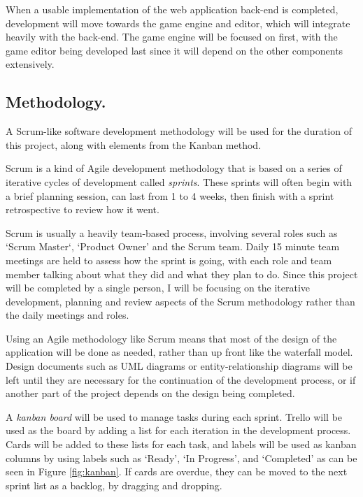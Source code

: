 \documentclass[a4paper, 12pt]{article}
\begin{document}
When a usable implementation of the web application back-end is completed, development will move towards the game engine and editor, which will integrate heavily with the back-end. The game engine will be focused on first, with the game editor being developed last since it will depend on the other components extensively.

\subsection{Methodology.}
A Scrum-like software development methodology will be used for the duration of this project, along with elements from the Kanban method.

Scrum is a kind of Agile development methodology that is based on a series of iterative cycles of development called \emph{sprints}. These sprints will often begin with a brief planning session, can last from 1 to 4 weeks, then finish with a sprint retrospective to review how it went.

Scrum is usually a heavily team-based process, involving several roles such as `Scrum Master`, `Product Owner' and the Scrum team. Daily 15 minute team meetings are held to assess how the sprint is going, with each role and team member talking about what they did and what they plan to do. Since this project will be completed by a single person, I will be focusing on the iterative development, planning and review aspects of the Scrum methodology rather than the daily meetings and roles.


Using an Agile methodology like Scrum means that most of the design of the application will be done as needed, rather than up front like the waterfall model. Design documents such as UML diagrams or entity-relationship diagrams will be left until they are necessary for the continuation of the development process, or if another part of the project depends on the design being completed.

A \emph{kanban board} will be used to manage tasks during each sprint. Trello will be used as the board by adding a list for each iteration in the development process. Cards will be added to these lists for each task, and labels will be used as kanban columns by using labels such as `Ready', `In Progress', and `Completed' as can be seen in Figure \ref{fig:kanban}. If cards are overdue, they can be moved to the next sprint list as a backlog, by dragging and dropping.
\end{document}
